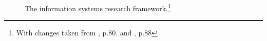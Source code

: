 
\begin{figure}
    \centering
    
    \caption[The information systems research framework]{The information systems research framework.\footnote{With changes taken from \cite{HevnerDesignScienceResearch2004}, p.80. and \cite{Hevnerthreecycleview2007}, p.88}}
    \label{fig:ISRFramework}
\end{figure}


